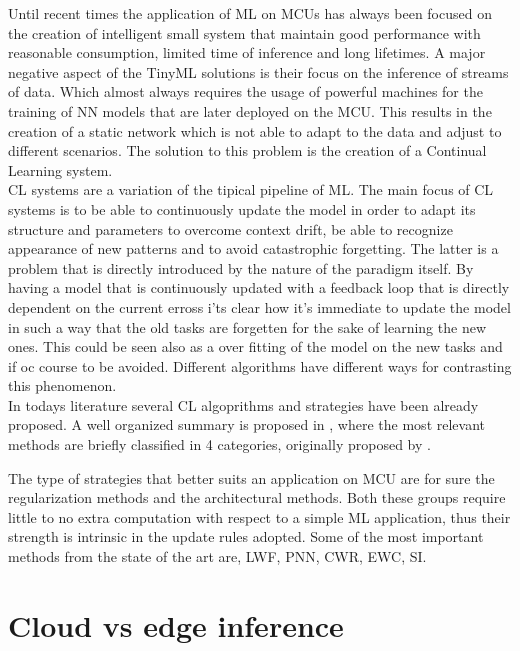 \documentclass[12pt]{report}
\begin{document}
Until recent times the application of ML on MCUs has always been focused on the creation of intelligent small system that maintain good performance with reasonable consumption, limited time of inference and long lifetimes. A major negative aspect of the TinyML solutions is their focus on the inference of streams of data. Which almost always requires the usage of powerful machines for the training of NN models that are later deployed on the MCU. This results in the creation of a static network which is not able to adapt to the data and adjust to different scenarios. The solution to this problem is the creation of a Continual Learning system. \\
CL systems are a variation of the tipical pipeline of ML. The main focus of CL systems is to be able to continuously update the model in order to adapt its structure and parameters to overcome context drift, be able to recognize appearance of new patterns and to avoid catastrophic forgetting. The latter is a problem that is directly introduced by the nature of the paradigm itself. By having a model that is continuously updated with a feedback loop that is directly dependent on the current erross i'ts clear how it's immediate to update the model in such a way that the old tasks are forgetten for the sake of learning the new ones. This could be seen also as a over fitting of the model on the new tasks and if oc course to be avoided. Different algorithms have different ways for contrasting this phenomenon. \\
In todays literature several CL algoprithms and strategies have been already proposed. A well organized summary is proposed in \cite{lesort2020continual}, where the most relevant methods are briefly classified in 4 categories, originally proposed by \autocite{maltoni2019continuous}.


The type of strategies that better suits an application on MCU are for sure the regularization methods and the architectural methods. Both these groups require little to no extra computation with respect to a simple ML application, thus their strength is intrinsic in the update rules adopted. Some of the most important methods from the state of the art are, LWF, PNN, CWR, EWC, SI. 

\section{Cloud vs edge inference}
\end{document}
